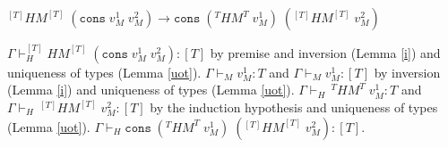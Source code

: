 \begin{case}
$^{[T]}HM^{[T]}\;(\mathtt{cons}\;v_{M}^{1}\;v_{M}^{2})\rightarrow\mathtt{cons}\;(^{T}HM^{T}\;v_{M}^{1})\;(^{[T]}HM^{[T]}\;v_{M}^{2})$

$\Gamma\vdash_{H}^{[T]}HM^{[T]}\;(\mathtt{cons}\;v_{M}^{1}\;v_{M}^{2}):[T]$ by premise and inversion (Lemma \ref{i}) and uniqueness of types (Lemma \ref{uot}).  $\Gamma\vdash_{M}v_{M}^{1}:T$ and $\Gamma\vdash_{M}v_{M}^{1}:[T]$ by inversion (Lemma \ref{i}) and uniqueness of types (Lemma \ref{uot}).  $\Gamma\vdash_{H}\,^{T}HM^{T}\;v_{M}^{1}:T$ and $\Gamma\vdash_{H}\,^{[T]}HM^{[T]}\;v_{M}^{2}:[T]$ by the induction hypothesis and uniqueness of types (Lemma \ref{uot}).  $\Gamma\vdash_{H}\mathtt{cons}\;(^{T}HM^{T}\;v_{M}^{1})\;(^{[T]}HM^{[T]}\;v_{M}^{2}):[T]$.
\end{case}